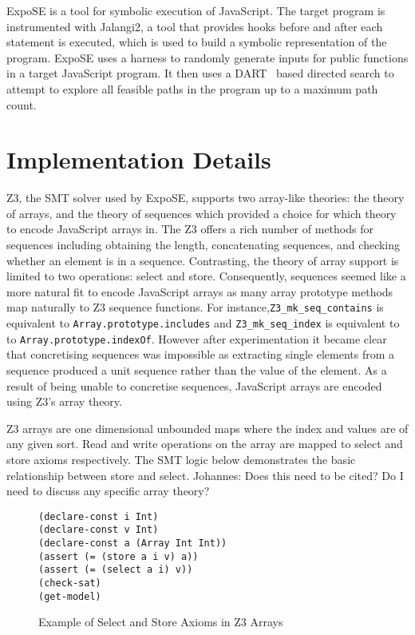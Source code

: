 \documentclass[]{final_report}
\begin{document}
ExpoSE is a tool for symbolic execution of JavaScript. The target program is instrumented with Jalangi2, a tool that provides hooks before and after each statement is executed, which is used to build a symbolic representation of the program. ExpoSE uses a harness to randomly generate inputs for public functions in a target JavaScript program. It then uses a DART~\cite{godefroid2005dart} based directed search to attempt to explore all feasible paths in the program up to a maximum path count.

\chapter{Implementation Details}
Z3, the SMT solver used by ExpoSE, supports two array-like theories: the theory of arrays, and the theory of sequences which provided a choice for which theory to encode JavaScript arrays in. The Z3 offers a rich number of methods for sequences including obtaining the length, concatenating sequences, and checking whether an element is in a sequence. Contrasting, the theory of array support is limited to two operations: select and store. Consequently, sequences seemed like a more natural fit to encode JavaScript arrays as many array prototype methods map naturally to Z3 sequence functions. For instance,\lstinline{Z3_mk_seq_contains} is equivalent to \lstinline{Array.prototype.includes} and \lstinline{Z3_mk_seq_index} is equivalent to to \lstinline{Array.prototype.indexOf}. However after experimentation it became clear that concretising sequences was impossible as extracting single elements from a sequence produced a unit sequence rather than the value of the element. As a result of being unable to concretise sequences, JavaScript arrays are encoded using Z3’s array theory.


Z3 arrays are one dimensional unbounded maps where the index and values are of any given sort. Read and write operations on the array are mapped to select and store axioms respectively. The SMT logic below demonstrates the basic relationship between store and select. Johannes: Does this need to be cited? Do I need to discuss any specific array theory?

\begin{figure}[h]
\begin{verbatim}
(declare-const i Int)
(declare-const v Int)
(declare-const a (Array Int Int))
(assert (= (store a i v) a))
(assert (= (select a i) v))
(check-sat)
(get-model)
\end{verbatim}
\caption{\label{fig:z3-select-store} Example of Select and Store Axioms in Z3 Arrays}
\end{figure}
\end{document}
